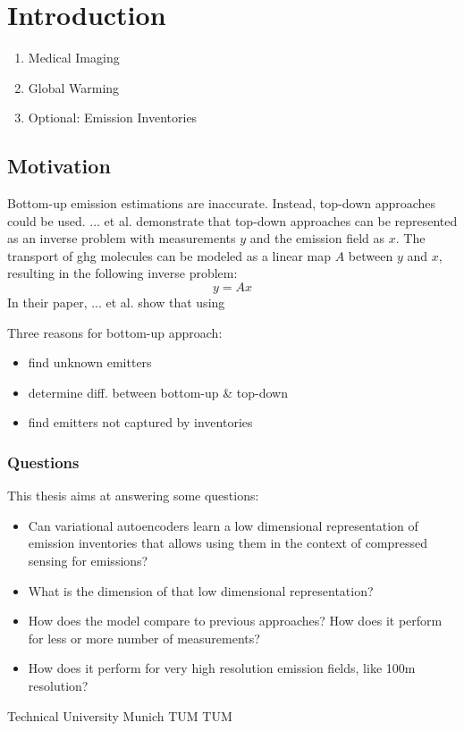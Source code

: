 
\chapter{Introduction}\label{chapter:introduction}

\begin{enumerate}
	\item Medical Imaging
	\item Global Warming
	\item Optional: Emission Inventories
\end{enumerate}

\section{Motivation}
Bottom-up emission estimations are inaccurate.
Instead, top-down approaches could be used.
... et al. demonstrate that top-down approaches can be represented as an inverse problem with measurements $y$ and the emission field as $x$.
The transport of ghg molecules can be modeled as a linear map $A$ between $y$ and $x$, resulting in the following inverse problem:
\begin{equation}
	y = Ax
\end{equation}
In their paper, ... et al. show that using

Three reasons for bottom-up approach:
\begin{itemize}
	\item find unknown emitters
	\item determine diff. between bottom-up \& top-down
	\item find emitters not captured by inventories
\end{itemize}

\subsection{Questions}
This thesis aims at answering some questions:
\begin{itemize}
	\item Can variational autoencoders learn a low dimensional representation of emission inventories that allows using them in the context of compressed sensing for emissions?
	\item What is the dimension of that low dimensional representation?
	\item How does the model compare to previous approaches? How does it perform for less or more number of measurements?
	\item How does it perform for very high resolution emission fields, like 100m resolution?
\end{itemize}

Technical University Munich \gls{TUM} \Gls{TUM}
